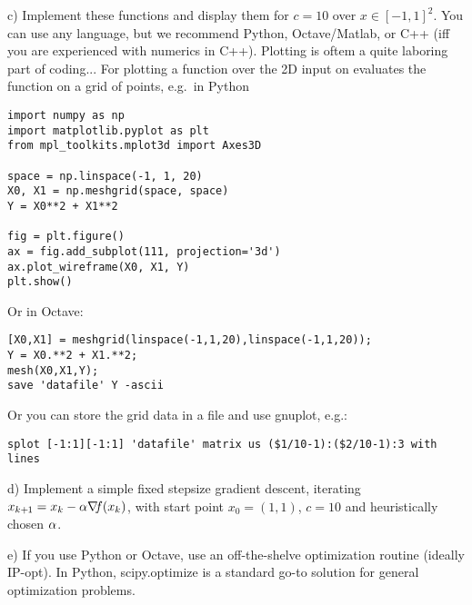 c) Implement these functions and display them for $c=10$ over
$x\in[-1,1]^2$. You can use any language, but we recommend Python,
Octave/Matlab, or C++ (iff you are experienced with numerics in
C++). Plotting is oftem a quite laboring part of coding... For
plotting a function over the 2D input on evaluates the function on a
grid of points, e.g.\ in Python\\
\quad\begin{code}
\begin{verbatim}
import numpy as np
import matplotlib.pyplot as plt
from mpl_toolkits.mplot3d import Axes3D

space = np.linspace(-1, 1, 20)
X0, X1 = np.meshgrid(space, space)
Y = X0**2 + X1**2

fig = plt.figure()
ax = fig.add_subplot(111, projection='3d')
ax.plot_wireframe(X0, X1, Y)
plt.show()
\end{verbatim}
\end{code}
Or in Octave:\\
\quad\begin{code}
\begin{verbatim}
[X0,X1] = meshgrid(linspace(-1,1,20),linspace(-1,1,20));
Y = X0.**2 + X1.**2;
mesh(X0,X1,Y);
save 'datafile' Y -ascii
\end{verbatim}
\end{code}
Or you can store the grid data in a file and use gnuplot, e.g.:\\
\begin{code}
\begin{verbatim}
splot [-1:1][-1:1] 'datafile' matrix us ($1/10-1):($2/10-1):3 with lines
\end{verbatim}
\end{code}

d) Implement a simple fixed stepsize gradient descent, iterating
$x_{k{{\hspace*{-.0pt}\text{\rm +}\hspace*{-.5pt}}1}} = x_k - \alpha {\nabla_{\!\!}} f(x_k)$, with start point $x_0=(1,1)$, $c=10$ and
heuristically chosen $\alpha$.

e) If you use Python or Octave, use an off-the-shelve optimization
routine (ideally IP-opt). In Python, scipy.optimize is a standard go-to
solution for general optimization problems.


\exerfoot

